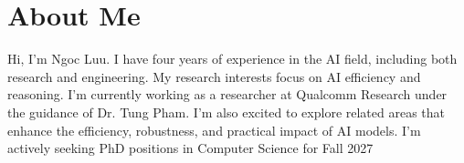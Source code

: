 \section{About Me}
\begin{itemize}[leftmargin=0.15in, label={}]
	\small{\item{
		Hi, I’m Ngoc Luu. I have four years of experience in the AI field, including both research and engineering. 
		My research interests focus on AI efficiency and reasoning.  
		I’m currently working as a researcher at Qualcomm Research under the guidance of Dr. Tung Pham.
		I’m also excited to explore related areas that enhance the efficiency, robustness, and practical impact of AI models.
		I’m actively seeking PhD positions in Computer Science for Fall 2027
	}}
\end{itemize}

